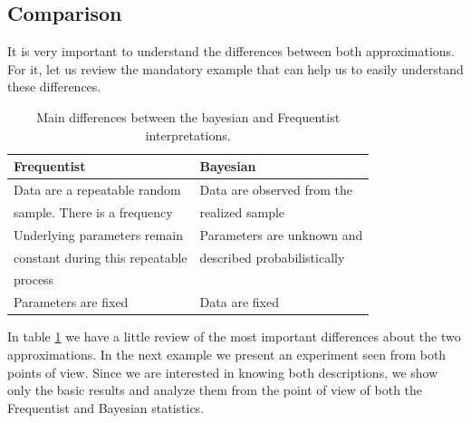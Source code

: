 \documentclass[onecolumn,           %
               showpacs,            %
               preprintnumbers,     %
               aps,                 %
               prl,          	    %
               letterpaper,             %
               superscriptaddress,      %
               nofootinbib,         %
               tightenlines,        %
               floats,floatfix      %
               ,usenatbib,
               ]{revtex4-1}
\begin{document}
\subsection{Comparison}

It is very important to understand the differences between both approximations. For it, let us review the mandatory example that can help us to easily understand these differences.
\begin{table}[h!]
\centering
\begin{tabular}{||l|l||} 
 \hline
 \textbf{Frequentist} & \textbf{Bayesian} \\ [0.5ex] 
 \hline\hline
 Data are a repeatable random  & Data are observed from the   \\ 
 sample. There is a frequency & realized sample \\
 \hline 
 Underlying parameters remain & Parameters are unknown and \\
 constant during this repeatable & described probabilistically \\
 process &  \\
\hline
Parameters are fixed & Data are fixed\\ [1ex] 
 \hline
\end{tabular}
\caption{\footnotesize{Main differences between the bayesian and Frequentist interpretations.}}
\label{table:1}
\end{table}

In table \ref{table:1} we have a little review of the most important differences about the two approximations. In the next example we present an experiment seen from both points of view. Since we are interested in knowing both descriptions, we show only the basic results and analyze them from the point of view of both the Frequentist and Bayesian statistics. 
\end{document}
